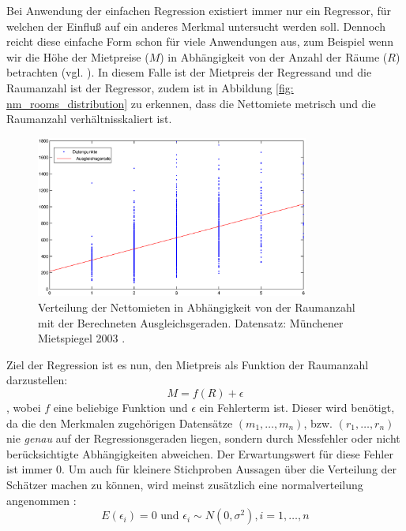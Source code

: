 Bei Anwendung der einfachen Regression existiert immer nur ein Regressor, für welchen der Einfluß auf ein anderes Merkmal untersucht werden soll.
Dennoch reicht diese einfache Form schon für viele Anwendungen aus, zum Beispiel wenn wir die Höhe der Mietpreise ($M$) in Abhängigkeit von der Anzahl der Räume ($R$) betrachten (vgl. ).
In diesem Falle ist der Mietpreis der Regressand und die Raumanzahl ist der Regressor, zudem ist in Abbildung \ref{fig: nm_rooms_distribution} zu erkennen, dass die Nettomiete metrisch und die Raumanzahl verhältnisskaliert ist.
\begin{figure}[t]
  \centering
  \includegraphics[width=0.8\textwidth]{figures/nm_rooms_distribution}
  \caption{Verteilung der Nettomieten in Abhängigkeit von der Raumanzahl mit der Berechneten Ausgleichsgeraden. Datensatz: Münchener Mietspiegel 2003 \cite{Fahrmeir2011}.}
  \label{fig:nm_rooms_distribution}
\end{figure}
Ziel der Regression ist es nun, den Mietpreis als Funktion der Raumanzahl darzustellen:
\begin{equation}
 M = f(R) + \epsilon
\end{equation}
, wobei $f$ eine beliebige Funktion und $\epsilon$ ein Fehlerterm ist.
Dieser wird benötigt, da die den Merkmalen zugehörigen Datensätze $(m_1, \dots, m_n)$, bzw. $(r_1, \dots, r_n)$ nie \textit{genau} auf der Regressionsgeraden liegen, sondern durch Messfehler oder nicht berücksichtigte Abhängigkeiten abweichen.
Der Erwartungswert für diese Fehler ist immer $0$. 
Um auch für kleinere Stichproben Aussagen über die Verteilung der Schätzer machen zu können, wird meinst zusätzlich eine normalverteilung angenommen \cite[S. 479]{Fahrmeir2010}:
\begin{equation}
  E(\epsilon_i) = 0 \text{ und } \epsilon_i \sim N(0,\sigma^2), i = 1, \dots, n
\end{equation}

